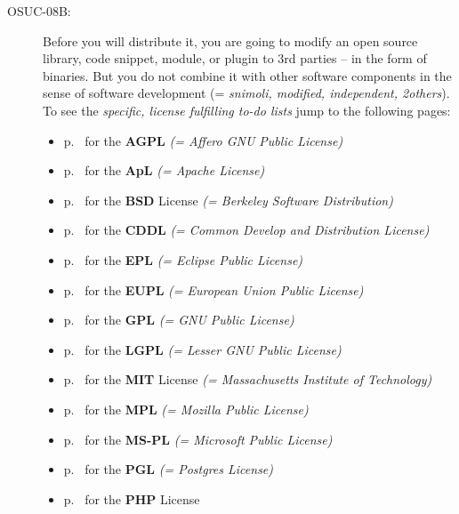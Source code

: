 \begin{description}
\item[OSUC-08B:]\label{OSUC-08B-DEF} Before you will distribute it, you are going
to modify an open source library, code snippet, module, or plugin to 3rd parties
-- in the form of binaries. But you do not combine it with other software
components in the sense of software development (= \textit{snimoli, modified,
independent, 2others}). To see the \textit{specific, license fulfilling to-do
lists} jump to the following pages:
  \begin{itemize}
    \item p.\ \pageref{OSUC-08B-AGPL} for the \textbf{AGPL}
      \textit{(= Affero GNU Public License)} 
    \item p.\ \pageref{OSUC-08B-Apache20} for the \textbf{ApL}
      \textit{(= Apache License)}
    \item p.\ \pageref{OSUC-08B-BSD} for the \textbf{BSD} License
      \textit{(= Berkeley Software Distribution)}
    \item p.\ \pageref{OSUC-08B-CDDL} for the \textbf{CDDL}
      \textit{(= Common Develop and Distribution License)}  
    \item p.\ \pageref{OSUC-08B-EPL} for the \textbf{EPL}
      \textit{(= Eclipse Public License)}     
    \item p.\ \pageref{OSUC-08B-EUPL} for the \textbf{EUPL}
      \textit{(= European Union Public License)} 
    \item p.\ \pageref{OSUC-08B-GPL} for the \textbf{GPL}
       \textit{(= GNU Public License)} 
    \item p.\ \pageref{OSUC-08B-LGPL} for the \textbf{LGPL}
      \textit{(= Lesser GNU Public License)}           
    \item p.\ \pageref{OSUC-08B-MIT} for the \textbf{MIT} License
       \textit{(= Massachusetts Institute of Technology)} 
    \item p.\ \pageref{OSUC-08B-MPL} for the \textbf{MPL}
      \textit{(= Mozilla Public License)}     
    \item p.\ \pageref{OSUC-08B-MS-PL} for the \textbf{MS-PL}
      \textit{(= Microsoft Public License)} 
    \item p.\ \pageref{OSUC-08B-PGL} for the \textbf{PGL}
      \textit{(= Postgres License)} 
    \item p.\ \pageref{OSUC-08B-PHP} for the \textbf{PHP} License 
  \end{itemize}


\end{description}
